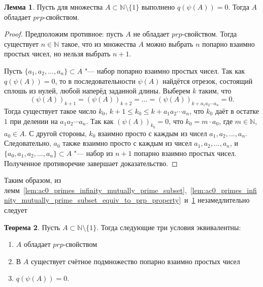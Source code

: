 \documentclass[a4paper,openbib]{article}
\renewcommand{\leq}{\leqslant}
\theoremstyle{definition}
\newtheorem{lemma}{Лемма}[section]
\newtheorem{theorem}[lemma]{Теорема}
\begin{document}

\begin{lemma}
	\label{lem:ac0_primes_q_psi_A_0_causes_prp}
	Пусть для множества $A\subset\mathbb{N}\setminus\{1\}$ выполнено $q(\psi(A))=0$.
	Тогда $A$ обладает $prp$-свойством.
\end{lemma}

\begin{proof}
	Предположим противное: пусть $A$ не обладает $prp$-свойством.
	Тогда существует $n\in\mathbb{N}$ такое, что из множества $A$ можно выбрать $n$
	попарно взаимно простых чисел, но нельзя выбрать $n+1$.

	Пусть $\{a_1, a_2, ..., a_n\}\subset A$ "--- набор попарно взаимно простых чисел.
	Так как $q(\psi(A))=0$, то в последовательности $\psi(A)$ найдётся отрезок, состоящий сплошь из нулей,
	любой наперёд заданной длины.
	Выберем $k$ таким, что
	\begin{equation}
		(\psi(A))_{k+1} = (\psi(A))_{k+2} = ... = (\psi(A))_{k+a_1a_2\cdots a_n} = 0
		.
	\end{equation}
	Тогда существует такое число $k_0$, $k+1 \leq k_0 \leq k+a_1a_2\cdots a_n$,
	что $k_0$ даёт в остатке $1$ при делении на $a_1a_2\cdots a_n$.
	Так как $(\psi(A))_{k_0} = 0$, что $k_0 = m\cdot a_0$, где $m\in\mathbb{N}$, $a_0\in A$.
	С другой стороны, $k_0$ взаимно просто с каждым из чисел $a_1, a_2, ..., a_n$.
	Следовательно, $a_0$ также взаимно просто с каждым из чисел $a_1, a_2, ..., a_n$,
	и $\{a_0, a_1, a_2, ..., a_n\}\subset A$ "--- набор из $n+1$ попарно взаимно простых чисел.
	Полученное противоречие завершает доказательство.
\end{proof}

Таким образом,
из лемм~\ref{lem:ac0_primes_infinity_mutually_prime_subset},~\ref{lem:ac0_primes_infinity_mutually_prime_subset_equiv_to_prp_property}~и~\ref{lem:ac0_primes_q_psi_A_0_causes_prp}
незамедлительно следует
\begin{theorem}
	Пусть $A\subset \mathbb{N}\setminus\{1\}$.
	Тогда следующие три условия эквивалентны:
	\begin{enumerate}
		\item
			$A$ обладает $prp$-свойством
		\item
			В $A$ существует счётное подмножество попарно взаимно простых чисел
		\item
			$q(\psi(A))=0$.
	\end{enumerate}
\end{theorem}
\end{document}
